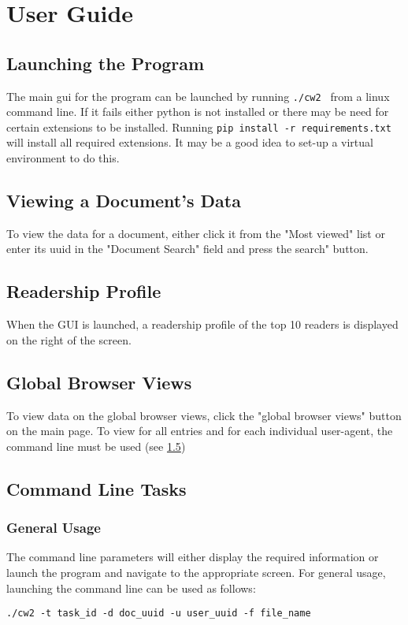\documentclass[12pt]{report}
\begin{document}
\chapter{User Guide}
\section{Launching the Program}
The main gui for the program can be launched by running \lstinline{./cw2 } from a linux command line.  If it fails either python is not installed or there may be need for certain extensions to be installed.  Running \lstinline{pip install -r requirements.txt} will install all required extensions.  It may be a good idea to set-up a virtual environment\cite{_virtual_????} to do this.
\section{Viewing a Document's Data}
To view the data for a document, either click it from the "Most viewed" list or enter its uuid in the "Document Search" field and press the search" button.
\section{Readership Profile}
When the GUI is launched, a readership profile of the top 10 readers is displayed on the right of the screen.
\section{Global Browser Views}
To view data on the global browser views, click the "global browser views" button on the main page.  To view for all entries and for each individual user-agent, the command line must be used (see \ref{usercommand})
\section{Command Line Tasks}\label{usercommand} %
\subsection{General Usage}
The command line parameters will either display the required information or launch the program and navigate to the appropriate screen.  For general usage, launching the command line can be used as follows:
\begin{lstlisting}
./cw2 -t task_id -d doc_uuid -u user_uuid -f file_name
\end{lstlisting}
\end{document}
